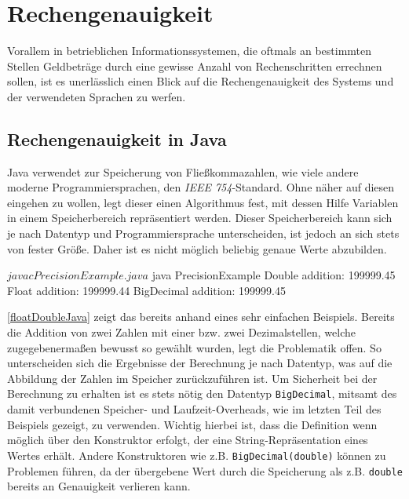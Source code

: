 \section{Rechengenauigkeit}
Vorallem in betrieblichen Informationssystemen, die oftmals an bestimmten Stellen Geldbeträge durch eine gewisse Anzahl von Rechenschritten errechnen sollen, ist es unerlässlich einen Blick auf die Rechengenauigkeit des Systems und der verwendeten Sprachen zu werfen.

\subsection*{Rechengenauigkeit in Java}
Java verwendet zur Speicherung von Fließkommazahlen, wie viele andere moderne Programmiersprachen, den \textit{IEEE 754}-Standard. Ohne näher auf diesen eingehen zu wollen, legt dieser einen Algorithmus fest, mit dessen Hilfe Variablen in einem Speicherbereich repräsentiert werden. Dieser Speicherbereich kann sich je nach Datentyp und Programmiersprache unterscheiden, ist jedoch an sich stets von fester Größe. Daher ist es nicht möglich beliebig genaue Werte abzubilden. 

\sepCodeAndOutputCheck
\begin{shellwindow}
$ javac PrecisionExample.java 
$ java PrecisionExample
Double addition: 199999.45
Float addition: 199999.44
BigDecimal addition: 199999.45
\end{shellwindow}

\autoref{floatDoubleJava} zeigt das bereits anhand eines sehr einfachen Beispiels. Bereits die Addition von zwei Zahlen mit einer bzw. zwei Dezimalstellen, welche zugegebenermaßen bewusst so gewählt wurden, legt die Problematik offen. So unterscheiden sich die Ergebnisse der Berechnung je nach Datentyp, was auf die Abbildung der Zahlen im Speicher zurückzuführen ist. Um Sicherheit bei der Berechnung zu erhalten ist es stets nötig den Datentyp \texttt{BigDecimal}, mitsamt des damit verbundenen Speicher- und Laufzeit-Overheads, wie im letzten Teil des Beispiels gezeigt, zu verwenden. Wichtig hierbei ist, dass die Definition wenn möglich über den Konstruktor erfolgt, der eine String-Repräsentation eines Wertes erhält. Andere Konstruktoren wie z.B. \texttt{BigDecimal(double)} können zu Problemen führen, da der übergebene Wert durch die Speicherung als z.B. \texttt{double} bereits an Genauigkeit verlieren kann.

